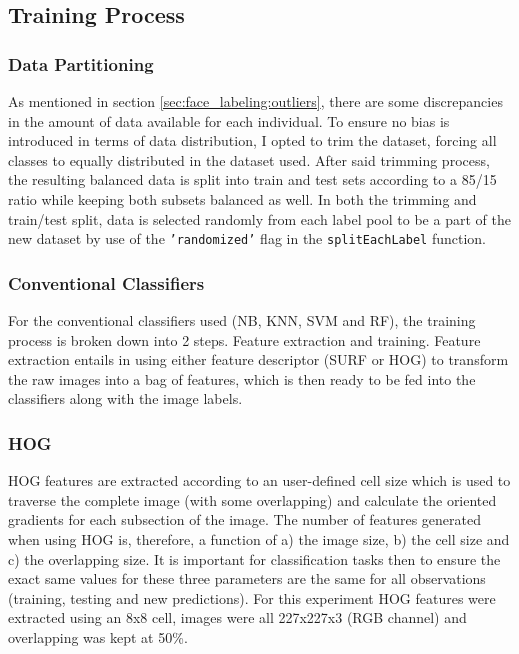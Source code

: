 \documentclass[11pt]{article}
\begin{document}
    \subsection{Training Process}
        \subsubsection{Data Partitioning}
            As mentioned in section \ref{sec:face_labeling:outliers}, there are some discrepancies in the amount of data available for each individual. To ensure no bias is introduced in terms of data distribution, I opted to trim the dataset, forcing all classes to equally distributed in the dataset used. After said trimming process, the resulting balanced data is split into train and test sets according to a 85/15 ratio while keeping both subsets balanced as well. In both the trimming and train/test split, data is selected randomly from each label pool to be a part of the new dataset by use of the \texttt{'randomized'} flag in the \texttt{splitEachLabel} function.

        \subsubsection{Conventional Classifiers}
            For the conventional classifiers used (NB, KNN, SVM and RF), the training process is broken down into 2 steps. Feature extraction and training. Feature extraction entails in using either feature descriptor (SURF or HOG) to transform the raw images into a bag of features, which is then ready to be fed into the classifiers along with the image labels.
        \subsubsection*{HOG}
            HOG features are extracted according to an user-defined cell size which is used to traverse the complete image (with some overlapping) and calculate the oriented gradients for each subsection of the image. The number of features generated when using HOG is, therefore, a function of a) the image size, b) the cell size and c) the overlapping size. It is important for classification tasks then to ensure the exact same values for these three parameters are the same for all observations (training, testing and new predictions). For this experiment HOG features were extracted using an 8x8 cell, images were all 227x227x3 (RGB channel) and overlapping was kept at 50\%.
\end{document}
